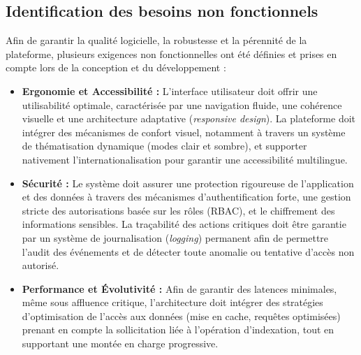 
\newpage
\subsection{Identification des besoins non fonctionnels}
Afin de garantir la qualité logicielle, la robustesse et la pérennité de la plateforme, plusieurs exigences non fonctionnelles ont été définies et prises en compte lors de la conception et du développement :

\begin{itemize}[label=$\blacktriangleright$]

\item \textbf{Ergonomie et Accessibilité :} 
L'interface utilisateur doit offrir une utilisabilité optimale, caractérisée par une navigation fluide, une cohérence visuelle et une architecture adaptative (\textit{responsive design}). La plateforme doit intégrer des mécanismes de confort visuel, notamment à travers un système de thématisation dynamique (modes clair et sombre), et supporter nativement l'internationalisation pour garantir une accessibilité multilingue.

\item \textbf{Sécurité :} 
Le système doit assurer une protection rigoureuse de l'application et des données à travers des mécanismes d'authentification forte, une gestion stricte des autorisations basée sur les rôles (RBAC), et le chiffrement des informations sensibles. La traçabilité des actions critiques doit être garantie par un système de journalisation (\textit{logging}) permanent afin de permettre l'audit des événements et de détecter toute anomalie ou tentative d'accès non autorisé.

\item \textbf{Performance et Évolutivité :} 
Afin de garantir des latences minimales, même sous affluence critique, l'architecture doit intégrer des stratégies d'optimisation de l'accès aux données (mise en cache, requêtes optimisées) prenant en compte la sollicitation liée à l'opération d'indexation, tout en supportant une montée en charge progressive.


\end{itemize}
